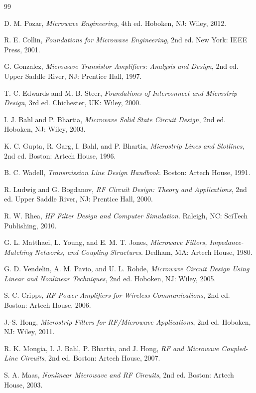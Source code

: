 \documentclass[11pt,a4paper]{article}
\begin{document}
\begin{thebibliography}{99}

D. M. Pozar, \emph{Microwave Engineering}, 4th ed. Hoboken, NJ: Wiley, 2012.

R. E. Collin, \emph{Foundations for Microwave Engineering}, 2nd ed. New York: IEEE Press, 2001.

G. Gonzalez, \emph{Microwave Transistor Amplifiers: Analysis and Design}, 2nd ed. Upper Saddle River, NJ: Prentice Hall, 1997.

T. C. Edwards and M. B. Steer, \emph{Foundations of Interconnect and Microstrip Design}, 3rd ed. Chichester, UK: Wiley, 2000.

I. J. Bahl and P. Bhartia, \emph{Microwave Solid State Circuit Design}, 2nd ed. Hoboken, NJ: Wiley, 2003.

K. C. Gupta, R. Garg, I. Bahl, and P. Bhartia, \emph{Microstrip Lines and Slotlines}, 2nd ed. Boston: Artech House, 1996.

B. C. Wadell, \emph{Transmission Line Design Handbook}. Boston: Artech House, 1991.

R. Ludwig and G. Bogdanov, \emph{RF Circuit Design: Theory and Applications}, 2nd ed. Upper Saddle River, NJ: Prentice Hall, 2000.

R. W. Rhea, \emph{HF Filter Design and Computer Simulation}. Raleigh, NC: SciTech Publishing, 2010.

G. L. Matthaei, L. Young, and E. M. T. Jones, \emph{Microwave Filters, Impedance-Matching Networks, and Coupling Structures}. Dedham, MA: Artech House, 1980.

G. D. Vendelin, A. M. Pavio, and U. L. Rohde, \emph{Microwave Circuit Design Using Linear and Nonlinear Techniques}, 2nd ed. Hoboken, NJ: Wiley, 2005.

S. C. Cripps, \emph{RF Power Amplifiers for Wireless Communications}, 2nd ed. Boston: Artech House, 2006.

J.-S. Hong, \emph{Microstrip Filters for RF/Microwave Applications}, 2nd ed. Hoboken, NJ: Wiley, 2011.

R. K. Mongia, I. J. Bahl, P. Bhartia, and J. Hong, \emph{RF and Microwave Coupled-Line Circuits}, 2nd ed. Boston: Artech House, 2007.

S. A. Maas, \emph{Nonlinear Microwave and RF Circuits}, 2nd ed. Boston: Artech House, 2003.


\end{thebibliography}
\end{document}
